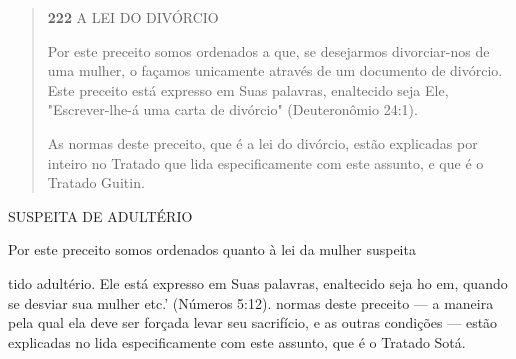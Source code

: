 \begin{quote}
\textbf{222} A LEI DO DIVÓRCIO

Por este preceito somos ordenados a que, se desejarmos divorciar-nos de
uma mulher, o façamos unicamente através de um documento de divór­cio.
Este preceito está expresso em Suas palavras, enaltecido seja Ele,
"Escrever-lhe-á uma carta de divórcio" (Deuteronômio 24:1).

As normas deste preceito, que é a lei do divórcio, estão explicadas por
inteiro no Tratado que lida especificamente com este assunto, e que é o
Tratado Guitin.
\end{quote}

SUSPEITA DE ADULTÉRIO

Por este preceito somos ordenados quanto à lei da mulher suspeita

tido adultério. Ele está expresso em Suas palavras, enaltecido seja ho
em, quando se desviar sua mulher etc.' (Números 5:12). normas deste
preceito --- a maneira pela qual ela deve ser forçada levar seu
sacrifício, e as outras condições --- estão explicadas no lida
especificamente com este assunto, que é o Tratado Sotá.

